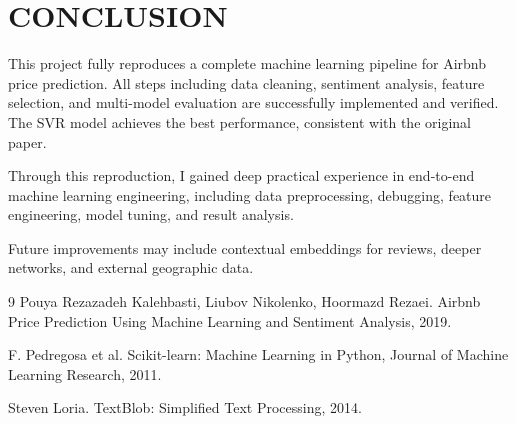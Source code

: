\documentclass[11pt,a4paper]{article}
\begin{document}
\section{CONCLUSION}
This project fully reproduces a complete machine learning pipeline for Airbnb price prediction. All steps including data cleaning, sentiment analysis, feature selection, and multi-model evaluation are successfully implemented and verified. The SVR model achieves the best performance, consistent with the original paper.

Through this reproduction, I gained deep practical experience in end-to-end machine learning engineering, including data preprocessing, debugging, feature engineering, model tuning, and result analysis.

Future improvements may include contextual embeddings for reviews, deeper networks, and external geographic data.

\newpage

\begin{thebibliography}{9}
Pouya Rezazadeh Kalehbasti, Liubov Nikolenko, Hoormazd Rezaei.
Airbnb Price Prediction Using Machine Learning and Sentiment Analysis, 2019.

F. Pedregosa et al. Scikit-learn: Machine Learning in Python, Journal of Machine Learning Research, 2011.

Steven Loria. TextBlob: Simplified Text Processing, 2014.
\end{thebibliography}
\end{document}
